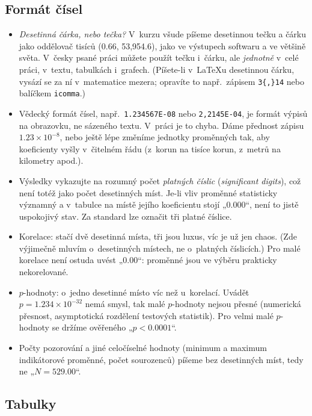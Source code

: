 \documentclass[11pt,a4paper]{article}
\begin{document}
\subsection*{Formát čísel}

\begin{itemize}[itemsep=2pt, topsep=2pt]
  \item \textit{Desetinná čárka, nebo tečka?} V~kurzu všude píšeme desetinnou tečku a čárku jako oddělovač tisíců (0.66, 53,954.6), jako ve výstupech softwaru a ve většině světa. V~česky psané práci můžete použít tečku i~čárku, ale \emph{jednotně} v~celé práci, v~textu, tabulkách i~grafech. (Píšete-li v~\LaTeX u desetinnou čárku, vysází se za ní v~matematice mezera; opravíte to např.\ zápisem \verb|3{,}14| nebo balíčkem \texttt{icomma}.)
  \item Vědecký formát čísel, např.\ \texttt{1.234567E-08} nebo \texttt{2,2145E-04}, je formát výpisů na obrazovku, ne sázeného textu. V~práci je to chyba. Dáme přednost zápisu $1.23 \times 10^{-8}$, nebo ještě lépe změníme jednotky proměnných tak, aby koeficienty vyšly v~čitelném řádu (z~korun na tisíce korun, z~metrů na kilometry apod.).
  \item Výsledky vykazujte na rozumný počet \emph{platných číslic} (\textit{significant digits}), což není totéž jako počet desetinných míst. Je-li vliv proměnné statisticky významný a v~tabulce na místě jejího koeficientu stojí „0.000“, není to jistě uspokojivý stav. Za standard lze označit tři platné číslice.
  \item Korelace: stačí dvě desetinná místa, tři jsou luxus, víc je už jen chaos. (Zde výjimečně mluvím o~desetinných místech, ne o~platných číslicích.) Pro malé korelace není ostuda uvést „0.00“: proměnné jsou ve výběru prakticky nekorelované.
  \item $p$-hodnoty: o~jedno desetinné místo víc než u~korelací. Uvádět $p = 1.234 \times 10^{-32}$ nemá smysl, tak malé $p$-hodnoty nejsou přesné (numerická přesnost, asymptotická rozdělení testových statistik). Pro velmi malé $p$-hodnoty se držíme ověřeného „$p < 0.0001$“.
  \item Počty pozorování a jiné celočíselné hodnoty (minimum a maximum indikátorové proměnné, počet sourozenců) píšeme bez desetinných míst, tedy ne „$N = 529.00$“.
\end{itemize}

\subsection*{Tabulky}
\end{document}
